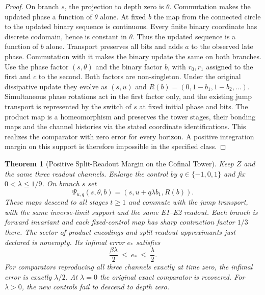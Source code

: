 \documentclass[11pt,a4paper]{article}
\newtheorem{theorem}{Theorem}[section]
\theoremstyle{definition}
\begin{document}
\begin{proof}
On branch $s$, the projection to depth zero is $\theta$. Commutation makes the updated phase a function of $\theta$ alone. At fixed $b$ the map from the connected circle to the updated binary sequence is continuous. Every finite binary coordinate has discrete codomain, hence is constant in $\theta$. Thus the updated sequence is a function of $b$ alone. Transport preserves all bits and adds $a$ to the observed late phase. Commutation with it makes the binary update the same on both branches. Use the phase factor $(s,\theta)$ and the binary factor $b$, with $r_0,r_1$ assigned to the first and $c$ to the second. Both factors are non-singleton. Under the original dissipative update they evolve as $(s,u)$ and $R(b)=(0,1-b_1,1-b_2,\ldots)$. Simultaneous phase rotations act in the first factor only, and the existing jump transport is represented by the switch of $s$ at fixed initial phase and bits. The product map is a homeomorphism and preserves the tower stages, their bonding maps and the channel histories via the stated coordinate identifications. This realizes the comparator with zero error for every horizon. A positive integration margin on this support is therefore impossible in the specified class.
\end{proof}

\begin{theorem}[Positive Split-Readout Margin on the Cofinal Tower]\label{thm:circle-prefix-cofinal-margin}
Keep $Z$ and the same three readout channels. Enlarge the control by $q\in\{-1,0,1\}$ and fix $0<\lambda\le1/9$. On branch $s$ set
\[
 \Psi_{u,q}(s,\theta,b)=(s,u+q\lambda b_1,R(b)).
\]
These maps descend to all stages $t\ge1$ and commute with the jump transport, with the same inverse-limit support and the same E1--E2 readout. Each branch is forward invariant and each fixed-control map has sharp contraction factor $1/3$ there. The sector of product encodings and split-readout approximants just declared is nonempty. Its infimal error $e_\ast$ satisfies
\[
 \frac{\beta\lambda}{2}\ \le\ e_\ast\ \le\ \frac{\lambda}{2}.
\]
For comparators reproducing all three channels exactly at time zero, the infimal error is exactly $\lambda/2$. At $\lambda=0$ the original exact comparator is recovered. For $\lambda>0$, the new controls fail to descend to depth zero.
\end{theorem}
\end{document}
